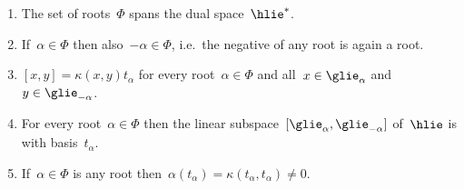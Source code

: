 \begin{proposition}
  \leavevmode
  \begin{enumerate}
    \item 
      The set of roots~$\Phi$ spans the dual space~$\hlie^*$.
    \item
      If~$\alpha \in \Phi$ then also~$-\alpha \in \Phi$, i.e.\ the negative of any root is again a root.
    \item
      \label{bracket via kappa}
      $[x,y] = \kappa(x,y) t_\alpha$ for every root~$\alpha \in \Phi$ and all~$x \in \glie_\alpha$ and~$y \in \glie_{-\alpha}$.
    \item
      For every root~$\alpha \in \Phi$ then the linear subspace~$[\glie_\alpha, \glie_{-\alpha}]$ of~$\hlie$ is {\onedimensional} with basis~$t_\alpha$.
    \item
      If~$\alpha \in \Phi$ is any root then~$\alpha(t_\alpha) = \kappa(t_\alpha, t_\alpha) \neq 0$.
  \end{enumerate}
\end{proposition}


